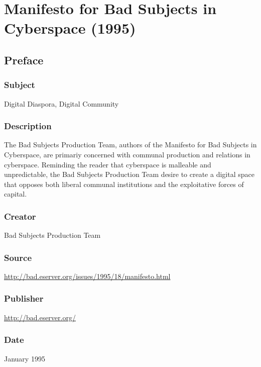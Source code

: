 \documentclass[letterpaper,12pt,english]{sphinxmanual}
\begin{document}
\chapter{Manifesto for Bad Subjects in Cyberspace (1995)}
\label{1995::doc}\label{1995:manifesto-for-bad-subjects-in-cyberspace-1995}\label{1995:index-0}

\section{Preface}
\label{1995:preface}

\subsection{Subject}
\label{1995:subject}
Digital Diaspora, Digital Community


\subsection{Description}
\label{1995:description}
The Bad Subjects Production Team, authors of the Manifesto for Bad Subjects in Cyberspace, are primariy concerned with communal production and relations in cyberspace. Reminding the reader that cyberspace is malleable and unpredictable, the Bad Subjects Production Team desire to create a digital space that opposes both liberal communal institutions and the exploitative forces of capital.


\subsection{Creator}
\label{1995:creator}
Bad Subjects Production Team


\subsection{Source}
\label{1995:source}
\url{http://bad.eserver.org/issues/1995/18/manifesto.html}


\subsection{Publisher}
\label{1995:publisher}
\url{http://bad.eserver.org/}


\subsection{Date}
\label{1995:date}
January 1995
\end{document}
